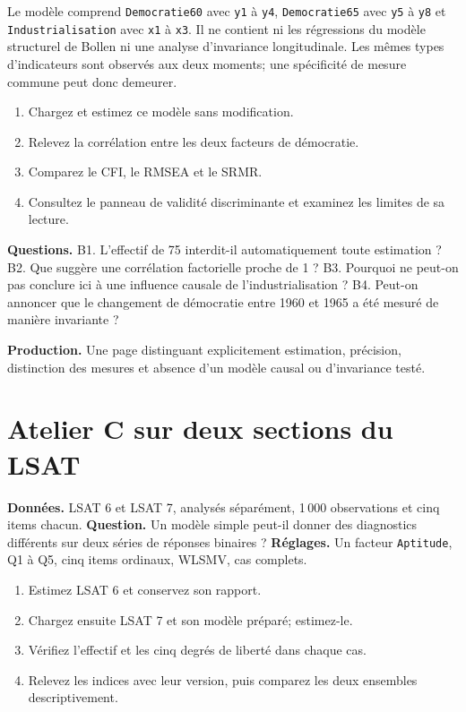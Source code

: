 \documentclass[
  french,
  11pt,
  a4paper,
  DIV=11,
  numbers=noendperiod]{scrreprt}
\providecommand{\tightlist}{%
  \setlength{\itemsep}{0pt}\setlength{\parskip}{0pt}}
\begin{document}
Le modèle comprend \texttt{Democratie60} avec \texttt{y1} à \texttt{y4},
\texttt{Democratie65} avec \texttt{y5} à \texttt{y8} et
\texttt{Industrialisation} avec \texttt{x1} à \texttt{x3}. Il ne
contient ni les régressions du modèle structurel de Bollen ni une
analyse d'invariance longitudinale. Les mêmes types d'indicateurs sont
observés aux deux moments; une spécificité de mesure commune peut donc
demeurer.

\begin{enumerate}
\def\labelenumi{\arabic{enumi}.}
\tightlist
\item
  Chargez et estimez ce modèle sans modification.
\item
  Relevez la corrélation entre les deux facteurs de démocratie.
\item
  Comparez le CFI, le RMSEA et le SRMR.
\item
  Consultez le panneau de validité discriminante et examinez les limites
  de sa lecture.
\end{enumerate}

\textbf{Questions.} B1. L'effectif de 75 interdit-il automatiquement
toute estimation ? B2. Que suggère une corrélation factorielle proche de
1 ? B3. Pourquoi ne peut-on pas conclure ici à une influence causale de
l'industrialisation ? B4. Peut-on annoncer que le changement de
démocratie entre 1960 et 1965 a été mesuré de manière invariante ?

\textbf{Production.} Une page distinguant explicitement estimation,
précision, distinction des mesures et absence d'un modèle causal ou
d'invariance testé.

\section{Atelier C sur deux sections du
LSAT}\label{atelier-c-sur-deux-sections-du-lsat}

\textbf{Données.} LSAT 6 et LSAT 7, analysés séparément, 1\,000
observations et cinq items chacun. \textbf{Question.} Un modèle simple
peut-il donner des diagnostics différents sur deux séries de réponses
binaires ? \textbf{Réglages.} Un facteur \texttt{Aptitude}, Q1 à Q5,
cinq items ordinaux, WLSMV, cas complets.

\begin{enumerate}
\def\labelenumi{\arabic{enumi}.}
\tightlist
\item
  Estimez LSAT 6 et conservez son rapport.
\item
  Chargez ensuite LSAT 7 et son modèle préparé; estimez-le.
\item
  Vérifiez l'effectif et les cinq degrés de liberté dans chaque cas.
\item
  Relevez les indices avec leur version, puis comparez les deux
  ensembles descriptivement.
\end{enumerate}
\end{document}
